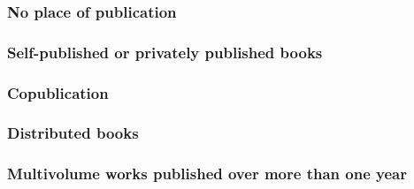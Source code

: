 \documentclass[11pt,letterpaper,oneside]{article}
\begin{document}
\setcounter{subsubsection}{131}
\subsubsection{No place of publication}

\begin{citebib}
\item \cite{windsor1910}
\item \cite{vliet1890}
\end{citebib}

\setcounter{subsubsection}{136}
\subsubsection{Self-published or privately published books}

\begin{citebib}
\item \cite{karavaev2015}
\item \cite{shumaker2014}
\end{citebib}

\setcounter{subsubsection}{139}
\subsubsection{Copublication}

\begin{citebib}
\item \cite{strauss1962}
\end{citebib}

\subsubsection{Distributed books}

\begin{citebib}
\item \cite{willke2007}
\end{citebib}

\setcounter{subsubsection}{143}
\subsubsection{Multivolume works published over more than one year}
\label{14.144}

\begin{citebib}
\item \cite[329]{hayek2011}
\item \cite{tillich1951}
\end{citebib}
\end{document}
